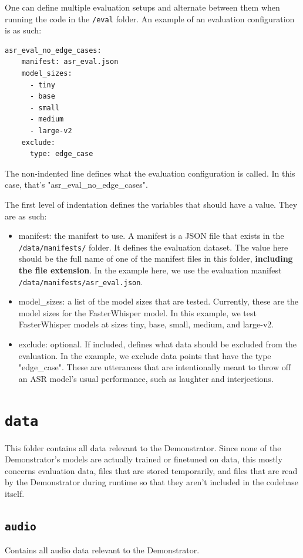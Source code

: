 One can define multiple evaluation setups and alternate between them when running the code in the \texttt{/eval} folder.
An example of an evaluation configuration is as such:
\begin{lstlisting}
asr_eval_no_edge_cases:
    manifest: asr_eval.json
    model_sizes:
      - tiny
      - base
      - small
      - medium
      - large-v2
    exclude:
      type: edge_case
\end{lstlisting}
The non-indented line defines what the evaluation configuration is called.
In this case, that's "asr\_eval\_no\_edge\_cases".

The first level of indentation defines the variables that should have a value.
They are as such:
\begin{itemize}
    \item manifest: the manifest to use. A manifest is a JSON file that exists in the \texttt{/data/manifests/} folder. It defines the evaluation dataset. The value here should be the full name of one of the manifest files in this folder, \textbf{including the file extension}. In the example here, we use the evaluation manifest \texttt{/data/manifests/asr\_eval.json}.
    \item model\_sizes: a list of the model sizes that are tested. Currently, these are the model sizes for the FasterWhisper model. In this example, we test FasterWhisper models at sizes tiny, base, small, medium, and large-v2.
    \item exclude: optional. If included, defines what data should be excluded from the evaluation. In the example, we exclude data points that have the type "edge\_case". These are utterances that are intentionally meant to throw off an ASR model's usual performance, such as laughter and interjections.
\end{itemize}

\section{\texttt{data}}
This folder contains all data relevant to the Demonstrator.
Since none of the Demonstrator's models are actually trained or finetuned on data, this mostly concerns evaluation data, files that are stored temporarily, and files that are read by the Demonstrator during runtime so that they aren't included in the codebase itself.

\subsection{\texttt{audio}}
Contains all audio data relevant to the Demonstrator.

